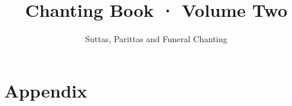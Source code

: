 \documentclass[
  babelLanguage=english,
  final,
]{chantingbook}
\title{Chanting Book · Volume Two}
\subtitle{Suttas, Parittas and Funeral Chanting}
\begin{document}


\frontmatter

\cleartoverso


\cleartorecto
\tableofcontents*



\cleartorecto
\listfirstlines*

\mainmatter



\part{Appendix}

\appendixsize





\cleartorecto

\end{document}
